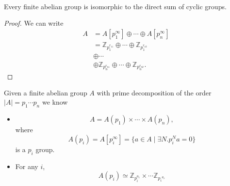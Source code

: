 \begin{corol}
Every finite abelian group is isomorphic to the direct sum of cyclic groups.
\end{corol}
\begin{proof}
We can write
\begin{align*}
A &= A[p_1^\infty] \oplus \cdots \oplus A[p_n^\infty] \\
  &=      \mathbb{Z}_{p_1^{r_{11}}} \oplus \cdots \oplus \mathbb{Z}_{p_1^{r_{1k}}} \\
  &\oplus \cdots \\
  &\oplus \mathbb{Z}_{p_n^{r_{n1}}} \oplus \cdots \oplus \mathbb{Z}_{p_n^{r_{nk}}}.
\end{align*}
\end{proof}

\begin{recap}
Given a finite abelian group $A$ with prime decomposition of the order
$|A| = p_1 \cdots p_n$ we know
\begin{itemize}
  \item{
    $$
    A = A(p_1) \times \cdots \times A(p_n),
    $$
    where
    $$
    A(p_i)
      = A[p_i^\infty]
      = \{ a \in A \mid \exists N . p_i^N a = 0 \}
    $$
    is a $p_i$ group.
  }
  \item{
    For any $i$,
    $$
    A(p_i) \simeq \mathbb{Z}_{p_i^{a_1}} \times \cdots \mathbb{Z}_{{p_i}^{a_r}}
    $$
  }
\end{itemize}
\end{recap}


